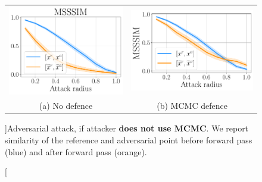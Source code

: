 \begin{figure}[h]
	\centering
	\begin{tabular}{cc}
		\includegraphics[width=0.4\columnwidth]{pics/3_adv_att/attack_mcmc_0_0.pdf} & 
		\includegraphics[width=0.43\columnwidth]{pics/3_adv_att/attack_mcmc_0_100.pdf} \\
		\small{(a) No defence} & \small{(b) MCMC defence} \\
	\end{tabular}
	\caption[][\baselineskip]{Adversarial attack, if attacker \textbf{does not use MCMC}. We report similarity of the reference and adversarial point before forward pass (blue) and after forward pass (orange). }
	\label{fig:no_mcmc_attack}
	\vspace*{2\baselineskip}
\end{figure}


